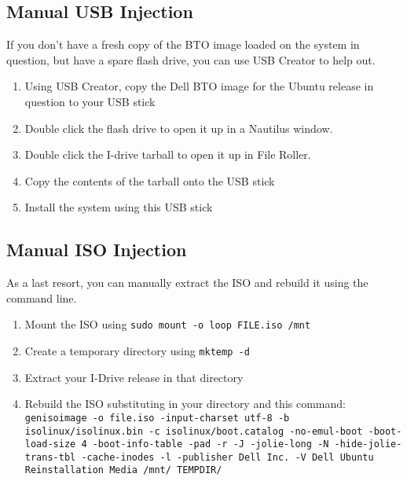 \documentclass[letterpaper,10pt,titlepage]{article}
\begin{document}
\subsection{Manual USB Injection}
If you don't have a fresh copy of the BTO image loaded on the system in question, but have a spare flash drive, you can use USB Creator to help out.
\begin{enumerate}
\item Using USB Creator, copy the Dell BTO image for the Ubuntu release in question to your USB stick
\item Double click the flash drive to open it up in a Nautilus window.
\item Double click the I-drive tarball to open it up in File Roller.
\item Copy the contents of the tarball onto the USB stick
\item Install the system using this USB stick
\end{enumerate}

\subsection{Manual ISO Injection}
As a last resort, you can manually extract the ISO and rebuild it using the command line.
\begin{enumerate}
\item Mount the ISO using \texttt{sudo mount -o loop FILE.iso /mnt}
\item Create a temporary directory using \texttt{mktemp -d}
\item Extract your I-Drive release in that directory
\item Rebuild the ISO substituting in your directory and this command: \texttt{genisoimage -o file.iso -input-charset utf-8 -b isolinux/isolinux.bin -c isolinux/boot.catalog -no-emul-boot -boot-load-size 4 -boot-info-table -pad -r -J -jolie-long -N -hide-jolie-trans-tbl -cache-inodes -l -publisher Dell Inc. -V Dell Ubuntu Reinstallation Media /mnt/ TEMPDIR/}
\end{enumerate}
\end{document}
